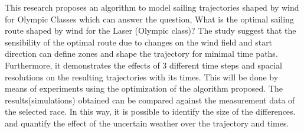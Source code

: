 This research proposes an algorithm to model sailing trajectories shaped by wind for Olympic Classes which %
can answer the question, What is the optimal sailing route shaped by wind for the Laser (Olympic class)?  The study suggest that the sensibility of the optimal route due to changes on the wind field and start direction can define zones and shape the trajectory for minimal time paths. \\

Furthermore, it demonstrates the effects of 3 different time steps and spacial resolutions on the resulting trajectories with its times. This will be done by means of experiments using the optimization of the algorithm proposed. The results(simulations) obtained can be compared against the measurement data of the selected race. In this way, it is possible to identify the size of the differences. and quantify the effect of the uncertain weather over the trajectory and times.


